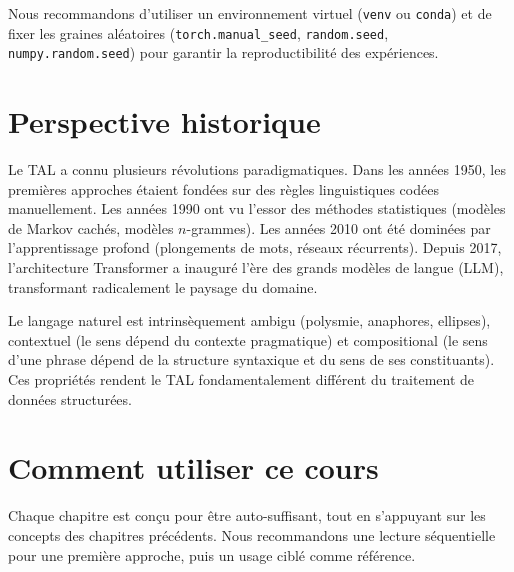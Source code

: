 \begin{bonnepratique}[title=\textbf{Environnement reproductible}]
Nous recommandons d'utiliser un environnement virtuel (\texttt{venv} ou
\texttt{conda}) et de fixer les graines al\'eatoires (\texttt{torch.manual\_seed},
\texttt{random.seed}, \texttt{numpy.random.seed}) pour garantir la
reproductibilit\'e des exp\'eriences.
\end{bonnepratique}

\section*{Perspective historique}

Le TAL a connu plusieurs r\'evolutions paradigmatiques. Dans les ann\'ees 1950,
les premi\`eres approches \'etaient fond\'ees sur des r\`egles linguistiques
cod\'ees manuellement. Les ann\'ees 1990 ont vu l'essor des m\'ethodes
statistiques (mod\`eles de Markov cach\'es, mod\`eles $n$-grammes). Les
ann\'ees 2010 ont \'et\'e domin\'ees par l'apprentissage profond (plongements
de mots, r\'eseaux r\'ecurrents). Depuis 2017, l'architecture Transformer
a inaugur\'e l'\`ere des grands mod\`eles de langue (LLM), transformant
radicalement le paysage du domaine.

\begin{intuition}[title=\textbf{Pourquoi le langage est-il difficile ?}]
Le langage naturel est intrins\`equement ambigu (polysmie, anaphores,
ellipses), contextuel (le sens d\'epend du contexte pragmatique) et
compositional (le sens d'une phrase d\'epend de la structure syntaxique et
du sens de ses constituants). Ces propri\'et\'es rendent le TAL
fondamentalement diff\'erent du traitement de donn\'ees structur\'ees.
\end{intuition}

\section*{Comment utiliser ce cours}

Chaque chapitre est con\c{c}u pour \^etre auto-suffisant, tout en s'appuyant
sur les concepts des chapitres pr\'ec\'edents. Nous recommandons une lecture
s\'equentielle pour une premi\`ere approche, puis un usage cibl\'e comme
r\'ef\'erence.

